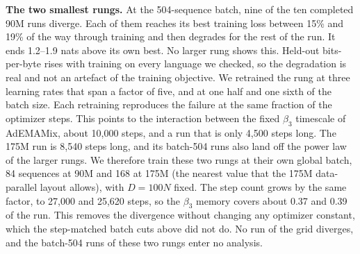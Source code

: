 \textbf{The two smallest rungs.} At the 504-sequence batch, nine of the ten completed 90M runs diverge. Each of them reaches its best training loss between 15\% and 19\% of the way through training and then degrades for the rest of the run. It ends 1.2--1.9 nats above its own best. No larger rung shows this. Held-out bits-per-byte rises with training on every language we checked, so the degradation is real and not an artefact of the training objective. We retrained the rung at three learning rates that span a factor of five, and at one half and one sixth of the batch size. Each retraining reproduces the failure at the same fraction of the optimizer steps. This points to the interaction between the fixed $\beta_3$ timescale of AdEMAMix, about 10,000 steps, and a run that is only 4,500 steps long. The 175M run is 8,540 steps long, and its batch-504 runs also land off the power law of the larger rungs. We therefore train these two rungs at their own global batch, 84 sequences at 90M and 168 at 175M (the nearest value that the 175M data-parallel layout allows), with $D = 100N$ fixed. The step count grows by the same factor, to 27,000 and 25,620 steps, so the $\beta_3$ memory covers about 0.37 and 0.39 of the run. This removes the divergence without changing any optimizer constant, which the step-matched batch cuts above did not do. No run of the grid diverges, and the batch-504 runs of these two rungs enter no analysis.
